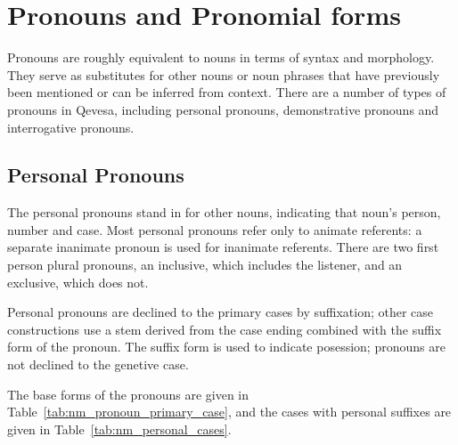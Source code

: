\documentclass[grammar]{subfiles}
\begin{document}



  \section{Pronouns and Pronomial forms}
  \label{sec:nm_pronouns}

  Pronouns are roughly equivalent to nouns in terms of syntax and morphology.  They serve as substitutes for other nouns or noun phrases that have previously been mentioned or can be inferred from context.  There are a number of types of pronouns in Qevesa, including personal pronouns, demonstrative pronouns and interrogative pronouns.


  \subsection{Personal Pronouns}
  \label{ssec:nm_personal_pronouns}

  The personal pronouns stand in for other nouns, indicating that noun's person, number and case.  Most personal pronouns refer only to animate referents: a separate inanimate pronoun is used for inanimate referents.  There are two first person plural pronouns, an inclusive, which includes the listener, and an exclusive, which does not. 

  Personal pronouns are declined to the primary cases by suffixation; other case constructions use a stem derived from the case ending combined with the suffix form of the pronoun.  The suffix form is used to indicate posession; pronouns are not declined to the genetive case.  

  The base forms of the pronouns are given in Table~\ref{tab:nm_pronoun_primary_case}, and the cases with personal suffixes are given in Table~\ref{tab:nm_personal_cases}.
\end{document}
